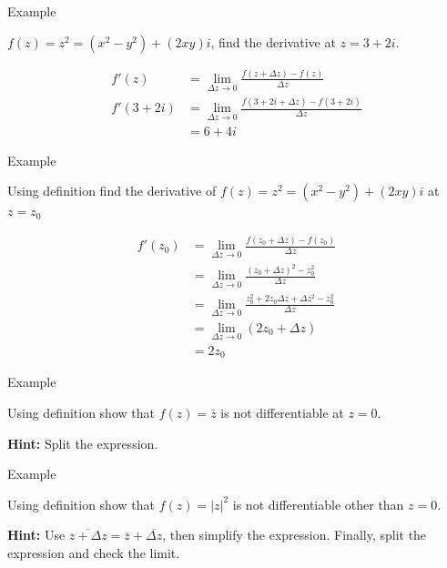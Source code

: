 \documentclass[11pt]{beamer}
\theoremstyle{plain}
\begin{document}
\begin{frame}{Example}
    \begin{example}
        $f(z)=z^2=(x^2-y^2)+(2xy)i$, find the derivative 
    at $z=3+2i$.
    \end{example} 
    \begin{align*}
        f'(z)&=\lim_{\Delta z\rightarrow0}\frac{f(z+\Delta z)-f(z)}{\Delta z}\\
        f'(3+2i)&=\lim_{\Delta z\rightarrow0}\frac{f(3+2i+\Delta z)-f(3+2i)}{\Delta z}\\
        &= 6+4i 
    \end{align*}
\end{frame}

\begin{frame}{Example}
    \begin{example}
        Using definition  find the derivative of $f(z)=z^2=(x^2-y^2)+(2xy)i$ at $z=z_0$
    \end{example} 
    \begin{align*}
        f'(z_0)&=\lim_{\Delta z\rightarrow0}\frac{f(z_0+\Delta z)-f(z_0)}{\Delta z}\\
        &=\lim_{\Delta z\rightarrow0} \frac{(z_0+\Delta z)^2-z_0^2}{\Delta z}\\
        &= \lim_{\Delta z\rightarrow0} \frac{z_0^2+2z_0\Delta z+\Delta z^2-z_0^2}{\Delta z}\\
        &= \lim_{\Delta z\rightarrow0} (2z_0+\Delta z)\\
        &= 2z_0
    \end{align*}
\end{frame}

\begin{frame}{Example}
    \begin{example}
        Using definition show that $f(z)=\bar z$ is not differentiable at $z=0$.
    \end{example} 
    \textbf{Hint:} Split the expression.
\end{frame}

\begin{frame}{Example}
    \begin{example}
        Using definition show that $f(z)=|z|^2$ is not differentiable other than $z=0$.
    \end{example} 
    \textbf{Hint:} Use $\overline{z+\Delta z}=\bar z+\overline{\Delta z}$, then simplify the expression. Finally, split the expression and check the limit.
\end{frame}
\end{document}
